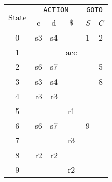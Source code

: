 \documentclass[border=0.8ex,varwidth]{standalone}
\begin{document}
\begin{table}
  \begin{tabular}{cccccc}
    \toprule
    \multirow{2}{*}{State} & \multicolumn{3}{c}{\texttt{ACTION}} &
                                                                  \multicolumn{2}{c}{\texttt{GOTO}}\\
    \cline{2-6}
                          & c & d & \(\$\) & \textit{S} & \textit{C} \\
    \midrule
    0 & s3 & s4 & & 1 & 2\\
    1 & & & acc & & \\
    2 & s6 & s7 & & & 5\\
    3 & s3 & s4 & & & 8\\
    4 & r3 & r3 & & & \\
    5 & & & r1 & & \\
    6 & s6 & s7 & & 9\\
    7 & & & r3 & & \\
    8 & r2 & r2 & & & \\
    9 & & & r2 & & \\
    \bottomrule
  \end{tabular}
\end{table}
\end{document}
